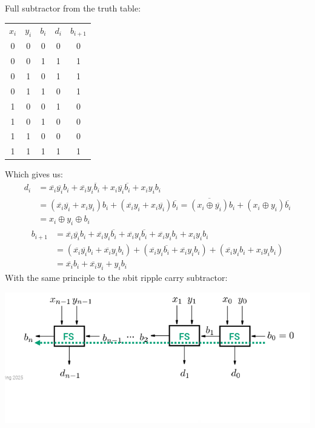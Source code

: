 \begin{parag}{Full subtractor}
    from the truth table:
    \begin{center}
    \begin{tabular}{ccccc}
        $x_i$ & $y_i$ & $b_i$ & $d_i$ & $b_{i+1}$ \\
        0&0&0&0&0\\
        0&0&1&1&1\\
        0&1&0&1&1\\
        0&1&1&0&1\\
        1&0&0&1&0\\
        1&0&1&0&0\\
        1&1&0&0&0\\
        1&1&1&1&1
    \end{tabular}
    \end{center}
   Which gives us:
   \begin{align*}
       d_i &= \overline{x_i} \overline{y_i} b_i + \overline{x_i}y_i \overline{b}_i + x_i \overline{y_i} \overline{b_i} + x_iy_ib_i\\
           &= ( \overline{x_i} \overline{y_i} + x_iy_i)b_i + ( \overline{x_i}y_i + x_i \overline{y_i}) \overline{b_i} = \overline{(x_i\oplus \overline{y_i})}b_i + (x_i \oplus y_i) \overline{b_i}\\
           &= x_i \oplus y_i \oplus b_i
   \end{align*}
   \begin{align*}
       b_{i+1} &= \overline{x_i} \overline{y_i} b_i + \overline{x_i}y_i \overline{b_i} + \overline{x_i}y_i \overline{b_i} + \overline{x_i}y_ib_i + x_iy_ib_i \\
    &= ( \overline{x_i} \overline{y_i} b_i + \overline{x_i}y_ib_i) + ( \overline{x_i}y_i \overline{b_i} + \overline{x_i}y_ib_i) + ( \overline{x_i}y_ib_i + x_iy_ib_i) \\
    &= \overline{x_i}b_i + \overline{x_i}y_i + y_ib_i
   \end{align*}
   With the same principle to the $n$bit ripple carry subtractor:
\begin{center}
    \includegraphics[scale=0.8]{52025-03-14.png}
\end{center}

   
   
\end{parag}
